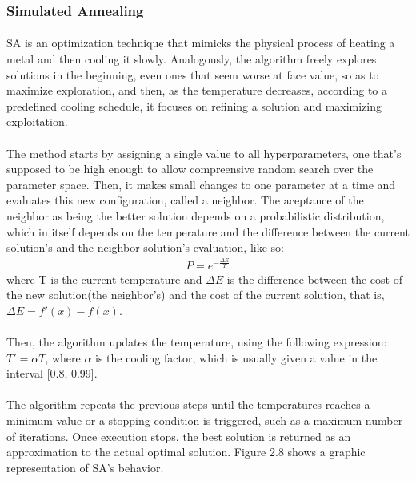 \subsubsection{Simulated Annealing}
\paragraph{}\ac{SA} is an optimization technique that mimicks the physical process of heating a metal and then cooling it slowly\cite{rutenbar1989simulated}. Analogously, the algorithm freely explores solutions in the beginning, even ones that seem worse at face value, so as to maximize exploration, and then, as the temperature decreases, according to a predefined cooling schedule, it focuses on refining a solution and maximizing exploitation.
\paragraph{}The method starts by assigning a single value to all hyperparameters, one that's supposed to be high enough to allow compreensive random search over the parameter space\cite{ghasemalizadeh2016review}. Then, it makes small changes to one parameter at a time and evaluates this new configuration, called a neighbor\cite{rutenbar1989simulated}. The aceptance of the neighbor as being the better solution depends on a probabilistic distribution, which in itself depends on the temperature and the difference between the current solution's and the neighbor solution's evaluation, like so:
\begin{gather*}
    P = e^{-\frac{\Delta E}{T}}
\end{gather*}
where T is the current temperature and $\Delta E$ is the difference between the cost of the new solution(the neighbor's) and the cost of the current solution, that is, $\Delta E = f'(x) - f(x)$.
\paragraph{}Then, the algorithm updates the temperature, using the following expression: $T' = \alpha T$, where $\alpha$ is the cooling factor, which is usually given a value in the interval [0.8, 0.99].
\paragraph{}The algorithm repeats the previous steps until the temperatures reaches a minimum value or a stopping condition is triggered, such as a maximum number of iterations\cite{ghasemalizadeh2016review}. Once execution stops, the best solution is returned as an approximation to the actual optimal solution. Figure 2.8 shows a graphic representation of SA’s behavior.

